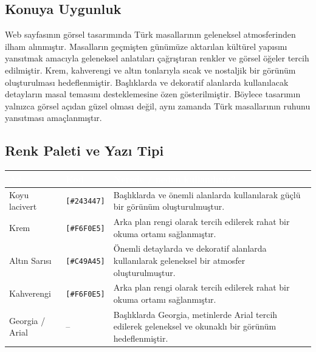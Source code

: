 \documentclass[12pt,a4paper]{article}
\begin{document}
\subsection{Konuya Uygunluk}
Web sayfasının görsel tasarımında Türk masallarının
geleneksel atmosferinden ilham alınmıştır. Masalların
geçmişten günümüze aktarılan kültürel yapısını yansıtmak
amacıyla geleneksel anlatıları çağrıştıran renkler ve
görsel öğeler tercih edilmiştir. Krem, kahverengi ve altın
tonlarıyla sıcak ve nostaljik bir görünüm oluşturulması
hedeflenmiştir. Başlıklarda ve dekoratif alanlarda
kullanılacak detayların masal temasını desteklemesine
özen gösterilmiştir. Böylece tasarımın yalnızca görsel
açıdan güzel olması değil, aynı zamanda Türk masallarının
ruhunu yansıtması amaçlanmıştır.

\subsection{Renk Paleti ve Yazı Tipi}
\begin{center}
\begin{tabular}{@{}llp{6.4cm}@{}}
\toprule
\rowcolor{ana}\textcolor{white}{\textbf{Ad}} & \textcolor{white}{\textbf{Kod}} & \textcolor{white}{\textbf{Nerede / neden kullandınız?}} \\
\midrule
\relax Koyu lacivert & \texttt{[\#243447]} & Başlıklarda ve önemli alanlarda kullanılarak
güçlü bir görünüm oluşturulmuştur. \\
\relax Krem & \texttt{[\#F6F0E5]} & Arka plan rengi olarak tercih edilerek
rahat bir okuma ortamı sağlanmıştır. \\
\relax Altın Sarısı & \texttt{[\#C49A45]} & Önemli detaylarda ve dekoratif alanlarda
kullanılarak geleneksel bir atmosfer oluşturulmuştur. \\
\relax Kahverengi & \texttt{[\#F6F0E5]} & Arka plan rengi olarak tercih edilerek
rahat bir okuma ortamı sağlanmıştır. \\
\relax Georgia / Arial & -- & Başlıklarda Georgia, metinlerde Arial tercih
edilerek geleneksel ve okunaklı bir görünüm hedeflenmiştir. \\
\bottomrule
\end{tabular}
\end{center}
\end{document}
